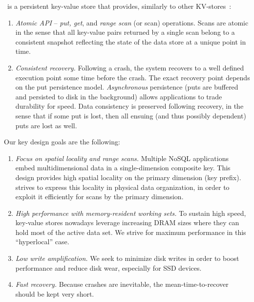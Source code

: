 \sys\ is a persistent key-value store that provides, similarly to other KV-stores~\cite{hbase,leveldb,RocksDB}:
\begin{enumerate}\itemsep0pt

\item \emph{Atomic API} -- \emph{put, get}, and \emph{range scan} (or scan) operations. 
Scans are atomic in the sense that all key-value pairs returned by a single scan belong to a consistent 
snapshot reflecting the state of the data store at a unique point in time.

\item \emph{Consistent recovery.} Following a crash, the system recovers to a well defined execution 
point some time before the crash. The exact recovery point depends on the put persistence model.
\emph{Asynchronous} persistence (puts are buffered and persisted to disk in the background) allows 
applications to trade durability for speed. Data consistency is preserved following recovery, 
in the sense that if some put is lost, then all ensuing (and thus possibly dependent) puts are lost as well.
\end{enumerate}

Our key design goals are the following:
\begin{enumerate}\itemsep0pt
\item \emph{Focus on spatial locality and range scans.}
 Multiple NoSQL applications embed multidimensional data in a single-dimension composite key. 
 This design provides high spatial locality on the primary dimension (key prefix). \sys\/ strives
 to express this locality in physical data organization, in order to exploit it efficiently for scans
 by the primary dimension. 
 
\item \emph{High performance  with memory-resident working sets.}
To sustain high speed, key-value stores nowadays leverage increasing DRAM sizes 
where they can hold most of the active data set. We strive for maximum performance 
in this ``hyperlocal'' case.

\item \emph{Low write amplification.} We seek to minimize disk writes in order to boost performance 
and reduce disk wear, especially for SSD devices. 

\item \emph{Fast recovery.}  Because crashes are inevitable, 
the mean-time-to-recover should be kept very short. 
\end{enumerate}

